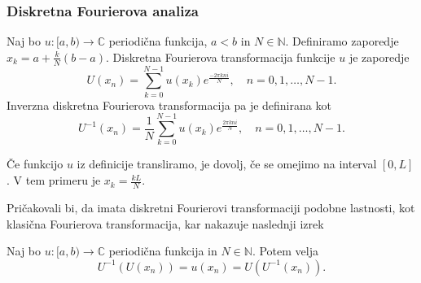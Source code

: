 \documentclass[mat2, tisk]{fmfdelo}
\newcommand{\N}{\mathbb N}
\newcommand{\C}{\mathbb C}
\begin{document}
\subsubsection{Diskretna Fourierova analiza}

\begin{definicija}
Naj bo $u: [a, b) \rightarrow \C$ periodična funkcija, $a < b$ in $N\in \N$. 
Definiramo zaporedje $x_k = a + \frac{k}{N}(b-a)$.
Diskretna Fourierova transformacija funkcije $u$ je zaporedje 
\begin{equation*}
U(x_n) = \sum_{k=0}^{N-1} u(x_k) e^{\frac{-2\pi k n i}{N}}, \quad n = 0, 1, \dots, N-1.
\end{equation*}
Inverzna diskretna Fourierova transformacija pa je definirana kot 
\begin{equation*}
  U^{-1}(x_n) = \frac{1}{N}\sum_{k=0}^{N-1} u(x_k) e^{\frac{2\pi k n i}{N}}, \quad n = 0, 1, \dots, N-1.
\end{equation*}
\end{definicija}

\begin{opomba}
Če funkcijo $u$ iz definicije transliramo, je dovolj, če se 
omejimo na interval $[0, L]$. V tem primeru je $x_k = \frac{kL}{N}$.
\end{opomba}

Pričakovali bi, da imata diskretni Fourierovi transformaciji podobne 
lastnosti, kot klasična Fourierova transformacija, kar nakazuje
naslednji izrek

\begin{izrek}
\label{izrek:iDFT}
Naj bo $u: [a, b) \rightarrow \C$ periodična funkcija in $N\in \N$. Potem velja
\begin{equation*}
U^{-1}(U(x_n)) = u(x_n) = U(U^{-1}(x_n)).
\end{equation*}
\end{izrek}
\end{document}
